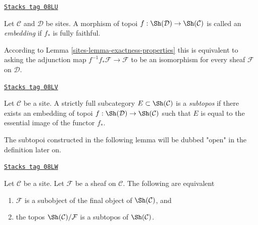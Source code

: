 \begin{definition}[Embedding]
\label{sites-definition-embedding}
\href{https://stacks.math.columbia.edu/tag/08LU}{\texttt{Stacks tag 08LU}}

Let $\mathcal{C}$ and $\mathcal{D}$ be sites.
A morphism of topoi $f : \Sh(\mathcal{D}) \to \Sh(\mathcal{C})$
is called an {\it embedding} if $f_*$ is fully faithful.
\end{definition}

According to Lemma \ref{sites-lemma-exactness-properties}
this is equivalent to asking the
adjunction map $f^{-1}f_*\mathcal{F} \to \mathcal{F}$
to be an isomorphism for every sheaf $\mathcal{F}$ on $\mathcal{D}$.

\begin{definition}[Subtopos]
\label{sites-definition-subtopos}
\href{https://stacks.math.columbia.edu/tag/08LV}{\texttt{Stacks tag 08LV}}

Let $\mathcal{C}$ be a site. A strictly full subcategory
$E \subset \Sh(\mathcal{C})$ is a {\it subtopos} if there
exists an embedding of topoi $f : \Sh(\mathcal{D}) \to \Sh(\mathcal{C})$
such that $E$ is equal to the essential image of the functor $f_*$.
\end{definition}

The subtopoi constructed in the following lemma will be dubbed
"open" in the definition later on.

\begin{lemma}
\label{sites-lemma-open-subtopos}
\href{https://stacks.math.columbia.edu/tag/08LW}{\texttt{Stacks tag 08LW}}

Let $\mathcal{C}$ be a site. Let $\mathcal{F}$ be a sheaf on
$\mathcal{C}$. The following are equivalent
\begin{enumerate}
\item $\mathcal{F}$ is a subobject of the final object of
$\Sh(\mathcal{C})$, and
\item the topos $\Sh(\mathcal{C})/\mathcal{F}$ is a subtopos of
$\Sh(\mathcal{C})$.
\end{enumerate}
\end{lemma}

